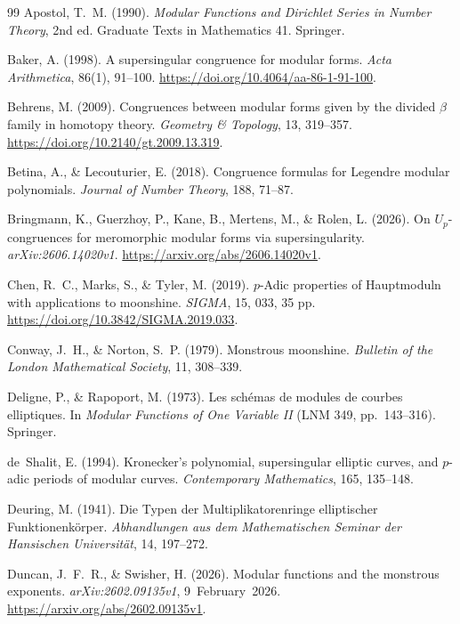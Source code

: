 \documentclass[11pt,a4paper]{article}
\numberwithin{equation}{section}
\theoremstyle{definition}
\theoremstyle{remark}
\begin{document}
\begin{thebibliography}{99}\small
{} Apostol, T.~M. (1990). \emph{Modular Functions and Dirichlet Series in Number Theory}, 2nd ed. Graduate Texts in Mathematics 41. Springer.

 Baker, A. (1998). A supersingular congruence for modular forms.
\emph{Acta Arithmetica}, 86(1), 91--100. \url{https://doi.org/10.4064/aa-86-1-91-100}.

 Behrens, M. (2009). Congruences between modular forms given by the divided $\beta$ family in homotopy theory. \emph{Geometry \& Topology}, 13, 319--357. \url{https://doi.org/10.2140/gt.2009.13.319}.

 Betina, A., \& Lecouturier, E. (2018). Congruence formulas for
Legendre modular polynomials. \emph{Journal of Number Theory}, 188, 71--87.

 Bringmann, K., Guerzhoy, P.,
Kane, B., Mertens, M., \& Rolen, L. (2026). On $U_p$-congruences for
meromorphic modular forms via supersingularity. \emph{arXiv:2606.14020v1}.
\url{https://arxiv.org/abs/2606.14020v1}.

 Chen, R.~C., Marks, S., \& Tyler, M. (2019).
$p$-Adic properties of Hauptmoduln with applications to moonshine.
\emph{SIGMA}, 15, 033, 35 pp. \url{https://doi.org/10.3842/SIGMA.2019.033}.

 Conway, J.~H., \& Norton, S.~P. (1979). Monstrous moonshine.
\emph{Bulletin of the London Mathematical Society}, 11, 308--339.

 Deligne, P., \& Rapoport, M. (1973). Les sch\'emas de modules de
courbes elliptiques. In \emph{Modular Functions of One Variable II} (LNM 349, pp.~143--316). Springer.

 de~Shalit, E. (1994). Kronecker's polynomial, supersingular elliptic curves,
and $p$-adic periods of modular curves. \emph{Contemporary Mathematics}, 165, 135--148.

 Deuring, M. (1941). Die Typen der Multiplikatorenringe elliptischer Funktionenk\"orper. \emph{Abhandlungen aus dem Mathematischen Seminar der Hansischen Universit\"at}, 14, 197--272.

 Duncan, J.~F.~R., \& Swisher, H. (2026).
Modular functions and the monstrous exponents. \emph{arXiv:2602.09135v1}, 9~February~2026. \url{https://arxiv.org/abs/2602.09135v1}.


\end{thebibliography}
\end{document}
